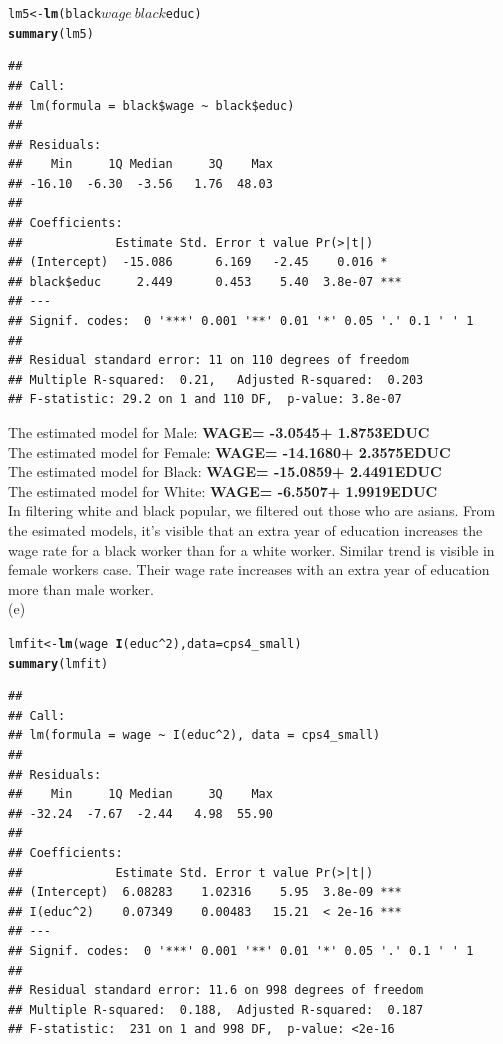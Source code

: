 \documentclass[a4paper]{article}\usepackage{graphicx, color}
\makeatletter
\newcommand{\hlfunctioncall}[1]{\textcolor[rgb]{0.501960784313725,0,0.329411764705882}{\textbf{#1}}}%
\newenvironment{kframe}{%
 \def\at@end@of@kframe{}%
 \ifinner\ifhmode%
  \def\at@end@of@kframe{\end{minipage}}%
  \begin{minipage}{\columnwidth}%
 \fi\fi%
 \def\FrameCommand##1{\hskip\@totalleftmargin \hskip-\fboxsep
 \colorbox{shadecolor}{##1}\hskip-\fboxsep
     \hskip-\linewidth \hskip-\@totalleftmargin \hskip\columnwidth}%
 \MakeFramed {\advance\hsize-\width
   \@totalleftmargin\z@ \linewidth\hsize
   \@setminipage}}%
 {\par\unskip\endMakeFramed%
 \at@end@of@kframe}
\newenvironment{knitrout}{}{} %
\makeatother
\begin{document}
\begin{knitrout}
\begin{kframe}
\begin{alltt}
lm5 <- \hlfunctioncall{lm}(black$wage ~ black$educ)
\hlfunctioncall{summary}(lm5)
\end{alltt}
\begin{verbatim}
## 
## Call:
## lm(formula = black$wage ~ black$educ)
## 
## Residuals:
##    Min     1Q Median     3Q    Max 
## -16.10  -6.30  -3.56   1.76  48.03 
## 
## Coefficients:
##             Estimate Std. Error t value Pr(>|t|)    
## (Intercept)  -15.086      6.169   -2.45    0.016 *  
## black$educ     2.449      0.453    5.40  3.8e-07 ***
## ---
## Signif. codes:  0 '***' 0.001 '**' 0.01 '*' 0.05 '.' 0.1 ' ' 1
## 
## Residual standard error: 11 on 110 degrees of freedom
## Multiple R-squared:  0.21,	Adjusted R-squared:  0.203 
## F-statistic: 29.2 on 1 and 110 DF,  p-value: 3.8e-07
\end{verbatim}
\end{kframe}
\end{knitrout}


The estimated model for Male: \textbf{WAGE= -3.0545+ 1.8753EDUC}\\
The estimated model for Female: \textbf{WAGE= -14.1680+ 2.3575EDUC}\\
The estimated model for Black: \textbf{WAGE= -15.0859+ 2.4491EDUC}\\
The estimated model for White: \textbf{WAGE= -6.5507+ 1.9919EDUC}\\

In filtering white and black popular, we filtered out those who are asians. From the esimated models, it's visible that an extra year of education increases the wage rate for a black worker than for a white worker. Similar trend is visible in female workers case. Their wage rate increases with an extra year of education more than male worker.\\

(e)

\begin{knitrout}
\color{fgcolor}\begin{kframe}
\begin{alltt}
lmfit <- \hlfunctioncall{lm}(wage ~ \hlfunctioncall{I}(educ^2), data = cps4_small)
\hlfunctioncall{summary}(lmfit)
\end{alltt}
\begin{verbatim}
## 
## Call:
## lm(formula = wage ~ I(educ^2), data = cps4_small)
## 
## Residuals:
##    Min     1Q Median     3Q    Max 
## -32.24  -7.67  -2.44   4.98  55.90 
## 
## Coefficients:
##             Estimate Std. Error t value Pr(>|t|)    
## (Intercept)  6.08283    1.02316    5.95  3.8e-09 ***
## I(educ^2)    0.07349    0.00483   15.21  < 2e-16 ***
## ---
## Signif. codes:  0 '***' 0.001 '**' 0.01 '*' 0.05 '.' 0.1 ' ' 1
## 
## Residual standard error: 11.6 on 998 degrees of freedom
## Multiple R-squared:  0.188,	Adjusted R-squared:  0.187 
## F-statistic:  231 on 1 and 998 DF,  p-value: <2e-16
\end{verbatim}
\end{kframe}
\end{knitrout}
\end{document}
